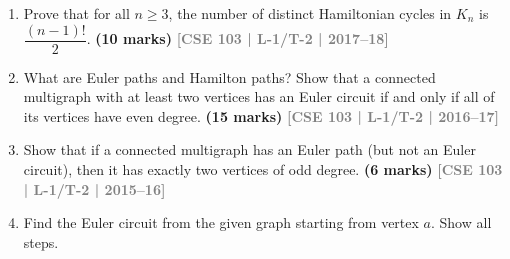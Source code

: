 \documentclass[12pt,a3paper]{article}
\newcommand{\yr}[1]{\hfill\textcolor{gray}{\small\textbf{[#1]}}}
\newcommand{\mk}[1]{\textcolor{orange!70!black}{\small\textbf{(#1 marks)}}}
\begin{document}
\begin{enumerate}
\begin{center}
\end{center}
Show that the bus route graph has an Euler circuit. Find the Euler circuit starting from node $F$. Show all steps.
\mk{10} \yr{CSE 103 | L-1/T-2 | Jan 2020}


\item Prove that for all $n \geq 3$, the number of distinct Hamiltonian cycles in $K_n$ is $\dfrac{(n-1)!}{2}$.
\mk{10} \yr{CSE 103 | L-1/T-2 | 2017--18}  

\item What are Euler paths and Hamilton paths? Show that a connected multigraph with at least two vertices has an Euler circuit if and only if all of its vertices have even degree.
\mk{15} \yr{CSE 103 | L-1/T-2 | 2016--17}

\item Show that if a connected multigraph has an Euler path (but not an Euler circuit), then it has exactly two vertices of odd degree.
\mk{6} \yr{CSE 103 | L-1/T-2 | 2015--16}

\item Find the Euler circuit from the given graph starting from vertex $a$. Show all steps.
\begin{center}
      \begin{tikzpicture}[scale=2, every node/.style={circle, draw=black, fill=black, inner sep=1.5pt, minimum size=4pt}]
        

\end{tikzpicture}
\end{center}
\end{enumerate}
\end{document}
